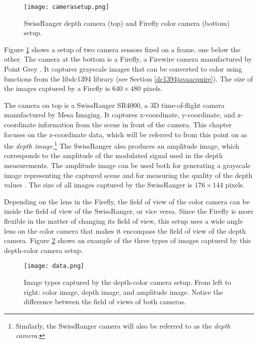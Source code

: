 \begin{figure}[t]
	\center
	\texttt{[image: camerasetup.png]}
	\caption[SwissRanger depth camera and Firefly color camera setup]{SwissRanger depth 
		camera (top) and Firefly color camera (bottom) setup.}
	\label{camerassetup}
\end{figure}

Figure \ref{camerassetup} shows a setup of two camera sensors fixed on a frame, one below the other. The 
camera at the bottom is a Firefly, a Firewire camera manufactured by Point Grey \cite{FireflyDatasheet}. 
It captures grayscale images that can be converted to color using functions from the libdc1394 library
(see Section \ref{dc1394javaacquire}). The size of the images captured by a Firefly is $640 \times 480$ 
pixels.

The camera on top is a SwissRanger SR4000, a 3D time-of-flight camera manufactured by Mesa Imaging. 
It captures x-coordinate, y-coordinate, and z-coordinate information from the scene 
in front of the camera. This chapter focuses on the z-coordinate data, which will be referred to from this point 
on as the \textit{depth image}.\footnote{Similarly, the SwissRanger camera will also be referred to as the 
\textit{depth camera}.} The SwissRanger also produces an amplitude image, which corresponds to 
the amplitude of the modulated signal used in the depth measurements. The amplitude image can be used 
both for generating a grayscale image representing the captured scene and for measuring the quality of the 
depth values \cite{SR4000Manual}. The size of all images captured by the SwissRanger is $176 \times 144$
pixels.

Depending on the lens in the Firefly, the field of view of the color camera can be inside the field of view of the 
SwissRanger, or vice versa. Since the Firefly is more flexible in the matter of changing its field of view, this 
setup uses a wide angle lens on the color camera that makes it encompass the field of view of the depth 
camera. Figure \ref{imagetypes} shows an example of the three types of images captured by this 
depth-color camera setup. 
 

\begin{figure}[t]
	\center
	\texttt{[image: data.png]}
	\caption[Image types captured by the depth-color camera setup]{Image types captured by the 
		depth-color camera setup. From left to right: color image, depth image, and amplitude image.
		Notice the difference between the field of views of both cameras.}
	\label{imagetypes}
\end{figure}